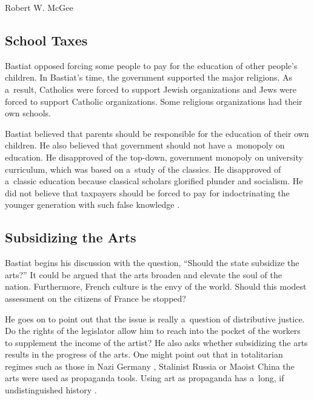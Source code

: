 \begin{artengenv}{Robert W. McGee}
\subsection{School Taxes }



Bastiat opposed forcing some people to pay for the education of other people's children. In Bastiat's time, the government supported the major religions. As a~result, Catholics were forced to support Jewish organizations and Jews were forced to support Catholic organizations. Some religious organizations had their own schools.



Bastiat believed that parents should be responsible for the education of their own children. He also believed that government should not have a~monopoly on education. He disapproved of the top-down, government monopoly on university curriculum, which was based on a~study of the classics. He disapproved of a~classic education because classical scholars glorified plunder and socialism. He did not believe that taxpayers should be forced to pay for indoctrinating the younger generation with such false knowledge 
\parencite[][pp.278–283]{bastiat_selected_1964}.%




\subsection{Subsidizing the Arts}



Bastiat begins his discussion with the question, ``Should the state subsidize the arts?'' 
\parencite[][p.11]{bastiat_selected_1964} %
 It could be argued that the arts broaden and elevate the soul of the nation. Furthermore, French culture is the envy of the world. Should this modest assessment on the citizens of France be stopped?



He goes on to point out that the issue is really a~question of distributive justice. Do the rights of the legislator allow him to reach into the pocket of the workers to supplement the income of the artist? He also asks whether subsidizing the arts results in the progress of the arts. One might point out that in totalitarian regimes such as those in Nazi Germany 
\parencite[][]{furstenau_how_2020}, %
 Stalinist Russia 
\parencite[][]{beale_history_2019} %
 or Maoist China 
\parencite[][]{burgess_art_2018} %
 the arts were used as propaganda tools. Using art as propaganda has a~long, if undistinguished history 
\parencites[][]{levy_art_2017}[][]{weissman_how_2023}.%





\end{artengenv}

